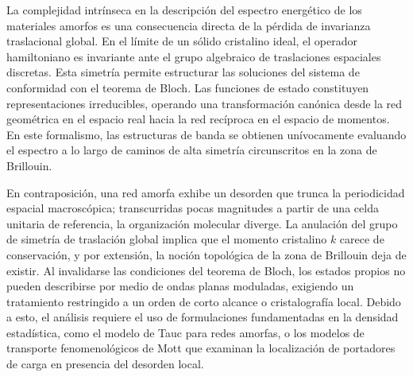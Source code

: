 \documentclass[pdflatex,sn-mathphys-num]{sn-jnl}
\theoremstyle{thmstyleone}%
\theoremstyle{thmstyletwo}%
\theoremstyle{thmstylethree}%
\begin{document}
La complejidad intrínseca en la descripción del espectro energético de
los materiales amorfos es una consecuencia directa de la pérdida de invarianza
traslacional global. En el límite de un sólido cristalino ideal, el operador
hamiltoniano es invariante ante el grupo algebraico de traslaciones espaciales
discretas. Esta simetría permite estructurar las soluciones del sistema de
conformidad con el teorema de Bloch. Las funciones de estado
constituyen representaciones irreducibles, operando una transformación canónica
desde la red geométrica en el espacio real hacia la red recíproca en el espacio
de momentos. En este formalismo, las estructuras de banda
se obtienen unívocamente evaluando el espectro a lo largo de caminos de alta
simetría circunscritos en la zona de Brillouin.

En contraposición, una red amorfa exhibe un desorden que trunca la periodicidad
espacial macroscópica; transcurridas pocas magnitudes a partir de una celda
unitaria de referencia, la organización molecular diverge. La
anulación del grupo de simetría de traslación global implica que el momento
cristalino $k$ carece de conservación, y por extensión, la noción topológica
de la zona de Brillouin deja de existir. Al invalidarse las
condiciones del teorema de Bloch, los estados propios no pueden describirse por
medio de ondas planas moduladas, exigiendo un tratamiento restringido a un orden
de corto alcance o cristalografía local. Debido a esto, el
análisis requiere el uso de formulaciones fundamentadas en la densidad
estadística, como el modelo de Tauc para redes amorfas, o los
modelos de transporte fenomenológicos de Mott que examinan la localización de
portadores de carga en presencia del desorden local.
\end{document}
